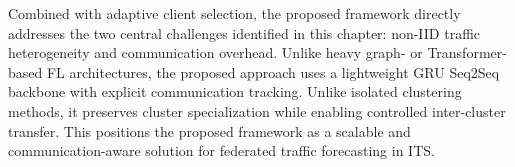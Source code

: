 Combined with adaptive client selection, the proposed framework directly addresses the two central challenges identified in this chapter: non-IID traffic heterogeneity and communication overhead. Unlike heavy graph- or Transformer-based FL architectures, the proposed approach uses a lightweight GRU Seq2Seq backbone with explicit communication tracking. Unlike isolated clustering methods, it preserves cluster specialization while enabling controlled inter-cluster transfer. This positions the proposed framework as a scalable and communication-aware solution for federated traffic forecasting in ITS.
